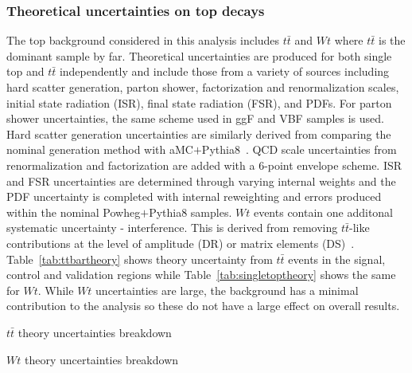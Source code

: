 \subsubsection{Theoretical uncertainties on top decays}
The top background considered in this analysis includes $t\bar{t}$ and $Wt$ where $t\bar{t}$ is the dominant sample by far. Theoretical uncertainties are produced for both single top and $t\bar{t}$ independently and include those from a variety of sources including hard scatter generation, parton shower, factorization and renormalization scales, initial state radiation (ISR), final state radiation (FSR), and PDFs. For parton shower uncertainties, the same scheme used in ggF and VBF samples is used. Hard scatter generation uncertainties are similarly derived from comparing the nominal generation method with aMC\@NLO$+$Pythia8~\cite{MG5}. QCD scale uncertainties from renormalization and factorization are added with a 6-point envelope scheme. ISR and FSR uncertainties are determined through varying internal weights and the PDF uncertainty is completed with internal reweighting and errors produced within the nominal Powheg$+$Pythia8 samples. $Wt$ events contain one additonal systematic uncertainty - interference. This is derived from removing $t\bar{t}$-like contributions at the level of amplitude (DR) or matrix elements (DS)~\cite{Wttheory}. Table~\ref{tab:ttbartheory} shows theory uncertainty from $t\bar{t}$ events in the signal, control and validation regions while Table~\ref{tab:singletoptheory} shows the same for $Wt$. While $Wt$ uncertainties are large, the background has a minimal contribution to the analysis so these do not have a large effect on overall results. 

\begin{table}[h!]
\centering
\scalebox{1.0}{

}
\caption{$t\bar{t}$ theory uncertainties breakdown}
\label{tab:ttbartheory}
\end{table}

\begin{table}[h!]
\centering
\scalebox{1.0}{

}
\caption{$Wt$ theory uncertainties breakdown}
\label{tab:singletoptheory}
\end{table}


